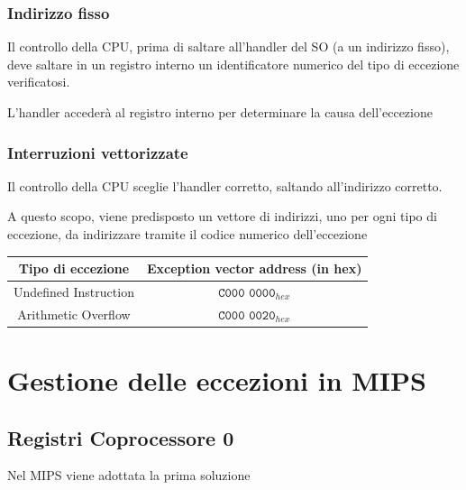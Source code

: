 \subsubsection{Indirizzo fisso}
Il controllo della CPU, prima di saltare all'handler del SO (a un indirizzo fisso), deve saltare in un registro interno un identificatore numerico del tipo di eccezione verificatosi.

L'handler accederà al registro interno per determinare la causa dell'eccezione

\subsubsection{Interruzioni vettorizzate}
Il controllo della CPU sceglie l'handler corretto, saltando all'indirizzo corretto.

A questo scopo, viene predisposto un vettore di indirizzi, uno per ogni tipo di eccezione, da indirizzare tramite il codice numerico dell'eccezione

\vspace{0.3cm}

\begin{center}
    \begin{tabular}{|c|c|}
        \hline \textbf{Tipo di eccezione} & \textbf{Exception vector address (in hex)} \\ \hline

        Undefined Instruction & $\texttt{C000\ 0000}_{hex}$ \\ \hline

        Arithmetic Overflow & $\texttt{C000\ 0020}_{hex}$ \\ \hline
        
    \end{tabular}
\end{center}

\section{Gestione delle eccezioni in MIPS}

\subsection{Registri Coprocessore 0}
Nel MIPS viene adottata la prima soluzione

